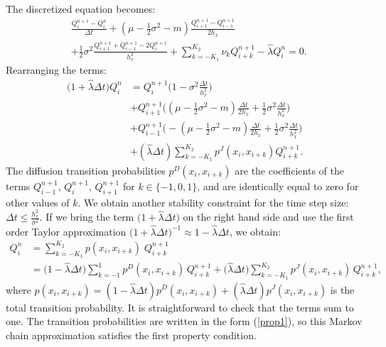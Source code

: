 The discretized equation becomes:
\begin{align}
&\frac{Q^{n+1}_{i} -Q^{n}_{i}}{\Delta t} + 
(\mu-\frac{1}{2}\sigma^2 - m) \frac{Q^{n+1}_{i+1} -Q^{n+1}_{i-1}}{ 2 h_x} \\ \nonumber
&+ \frac{1}{2} \sigma^2 \frac{Q^{n+1}_{i+1} + Q^{n+1}_{i-1} - 2 Q^{n+1}_{i}}{h_x^2} 
 + \sum_{k = -K_1}^{K_2} \nu_k Q^{n+1}_{i+k} - \hat \lambda Q^{n}_i = 0.
\end{align}
Rearranging the terms: 
\begin{align*}
\biggl(1+ \hat \lambda \Delta t \biggr) Q^{n}_{i} &= Q^{n+1}_{i} \biggl( 1 - \sigma^2 \frac{\Delta t}{h_x^2} \biggr)  \\
& + Q^{n+1}_{i+1} \biggl( (\mu-\frac{1}{2}\sigma^2 -m)\frac{\Delta t}{2 h_x} +
\frac{1}{2}\sigma^2 \frac{\Delta t}{h_x^2}  \biggr)  \\
& + Q^{n+1}_{i-1} \biggl( -(\mu-\frac{1}{2}\sigma^2 -m)\frac{\Delta t}{2 h_x} + 
\frac{1}{2}\sigma^2 \frac{\Delta t}{h_x^2}  \biggr) \\
& + (\hat \lambda \Delta t) \sum_{k = -K_1}^{K_2} p^J(x_i,x_{i+k}) Q^{n+1}_{i+k}.
\end{align*}
The diffusion transition probabilities
$p^D(x_i,x_{i+k})$
are the coefficients of the terms $Q^{n+1}_{i-1}$, $Q^{n+1}_{i}$, $Q^{n+1}_{i+1}$ for $k \in \{ -1, 0, 1\}$, and are 
identically equal to zero for other values of $k$.
We obtain another stability constraint for the time step size: $\Delta t \leq \frac{h_x^2}{\sigma^2}$.
If we bring the term $\bigl(1+\hat \lambda \Delta t \bigr)$ on the right hand side and use the first order Taylor approximation 
$\bigl(1+\hat \lambda \Delta t \bigr)^{-1} \approx 1 - \hat \lambda \Delta t$, we obtain: 
\begin{align}\label{expectation_tot}
 Q^{n}_{i} &= \sum_{k = -K_1}^{K_2} p(x_i,x_{i+k}) \; Q^{n+1}_{i+k}  \\ \nonumber
           &= \bigl(1 - \hat \lambda \Delta t \bigr) \sum_{k=-1}^1 p^D(x_i,x_{i+k}) \, Q^{n+1}_{i+k} 
           + \bigl( \hat \lambda \Delta t \bigr) \sum_{k = -K_1}^{K_2} p^J(x_i,x_{i+k}) \, Q^{n+1}_{i+k}, 
\end{align}
where $p(x_i,x_{i+k}) = (1 - \hat \lambda \Delta t) p^D(x_i,x_{i+k}) + ( \hat \lambda \Delta t ) p^J(x_i,x_{i+k})$ is the total transition
probability. It is straightforward to check that the terms sum to one. 
The transition probabilities are written in the form (\ref{prop1}), 
so this Markov chain approximation satisfies the first property condition.

